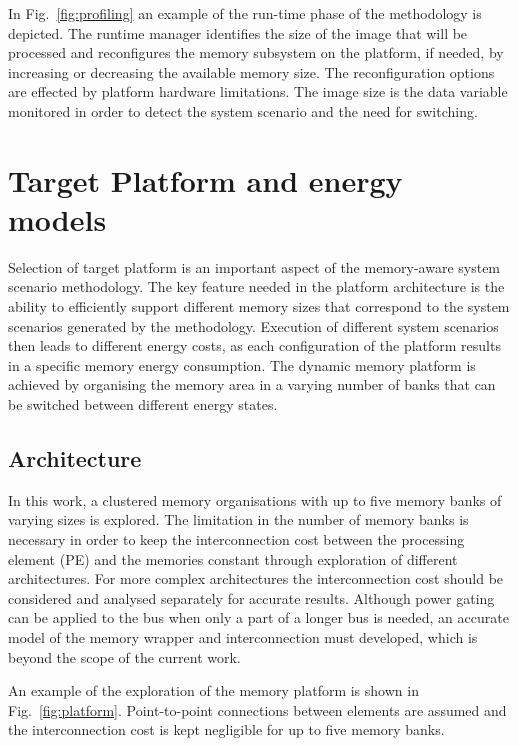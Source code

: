 \documentclass{acm_proc_article-sp}
\begin{document}
In Fig.~\ref{fig:profiling} an example of the run-time phase of the methodology is depicted. The runtime manager identifies the size of the image that will be processed and reconfigures the memory subsystem on the platform, if needed, by increasing or decreasing the available memory size. The reconfiguration options are effected by platform hardware limitations. The image size is the data variable monitored in order to detect the system scenario and the need for switching.

\section{Target Platform and energy \\ models}
\label{sec:platform}

Selection of target platform is an important aspect of the memory-aware system scenario methodology. The key feature needed in the platform architecture is the ability to efficiently support different memory sizes that correspond to the system scenarios generated by the methodology. Execution of different system scenarios then leads to different energy costs, as each configuration of the platform results in a specific memory energy consumption. The dynamic memory platform is achieved by organising the memory area in a varying number of banks that can be switched between different energy states. 
\vfill
\subsection{Architecture}

In this work, a clustered memory organisations with up to five memory banks of varying sizes is explored. The limitation in the number of memory banks is necessary in order to keep the interconnection cost between the processing element (PE) and the memories constant through exploration of different architectures. For more complex architectures the interconnection cost should be considered and analysed separately for accurate results. Although power gating can be applied to the bus when only a part of a longer bus is needed, an accurate model of the memory wrapper and interconnection must developed, which is beyond the scope of the current work. 

An example of the exploration of the memory platform is shown in Fig.~\ref{fig:platform}. Point-to-point connections between elements are assumed and the interconnection cost is kept negligible for up to five memory banks.
\end{document}
